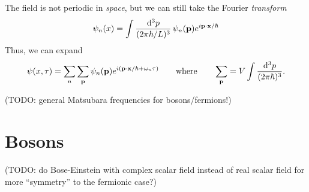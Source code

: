 The field is not periodic in \emph{space}, but we can still take the Fourier \emph{transform}
\begin{equation}
	\psi_n(x) = \int \frac{\mathop{}\!\mathrm{d}^3 p}{(2 \pi \hbar / L)^3} \, \psi_n(\mathbf{p}) e^{i \mathbf{p} \cdot \mathbf{x} / \hbar}
\end{equation}
Thus, we can expand
\begin{equation}
	\psi(x, \tau) = \sum_n \sum_{\mathbf{p}} \psi_n(\mathbf{p}) e^{i (\mathbf{p} \cdot \mathbf{x} / \hbar + \omega_n \tau)}
	\qquad \text{where} \qquad
	\sum_{\mathbf{p}} = V \int \frac{\mathop{}\!\mathrm{d}^3 p}{(2 \pi \hbar)^3} .
\end{equation}

(TODO: general Matsubara frequencies for bosons/fermions!)

\section{Bosons}

(TODO: do Bose-Einstein with complex scalar field instead of real scalar field for more ``symmetry'' to the fermionic case?)

